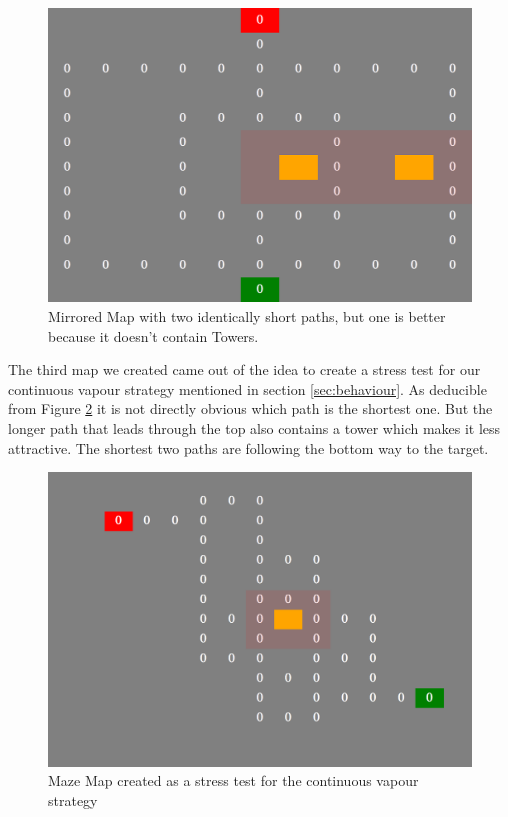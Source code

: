 \begin{figure}[H]
  \centering
  \includegraphics[width=1\linewidth]{images/map_mirror}
  \caption{Mirrored Map with two identically short paths, but one is better because it doesn't contain Towers.}
  \label{fig:mapsmirror}
\end{figure}


The third map we created came out of the idea to create a stress test for our continuous vapour strategy mentioned in section \ref{sec:behaviour}. As deducible from Figure \ref{fig:mapsmaze} it is not directly obvious which path is the shortest one. But the longer path that leads through the top also contains a tower which makes it less attractive. The shortest two paths are following the bottom way to the target.

\begin{figure}[H]
  \centering
  \includegraphics[width=1\linewidth]{images/map_maze}
  \caption{Maze Map created as a stress test for the continuous vapour strategy}
  \label{fig:mapsmaze}
\end{figure}

